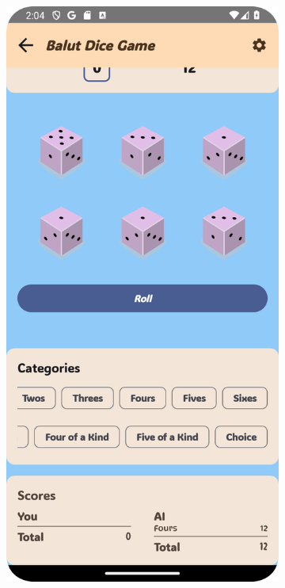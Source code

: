 \begin{figure}[ht!]
    \centering
    \begin{subfigure}[b]{0.27\textwidth}
        \includegraphics[width=\textwidth]{img/balut board.png}

\end{subfigure}
\end{figure}
